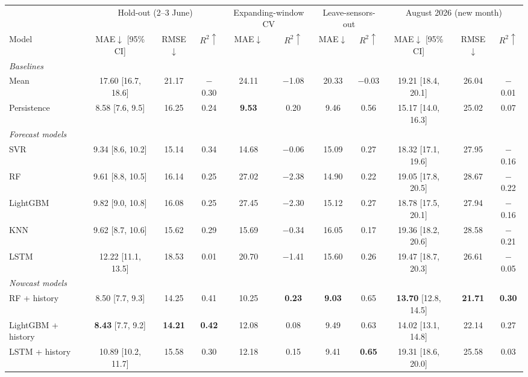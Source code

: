 \begin{tabular}{lcccccccccc}
\toprule
 & \multicolumn{3}{c}{Hold-out (2--3 June)} & \multicolumn{2}{c}{Expanding-window CV} & \multicolumn{2}{c}{Leave-sensors-out} & \multicolumn{3}{c}{August 2026 (new month)} \\
\cmidrule(lr){2-4}\cmidrule(lr){5-6}\cmidrule(lr){7-8}\cmidrule(lr){9-11}
Model & MAE$\downarrow$ [95\% CI] & RMSE$\downarrow$ & $R^2\uparrow$ & MAE$\downarrow$ & $R^2\uparrow$ & MAE$\downarrow$ & $R^2\uparrow$ & MAE$\downarrow$ [95\% CI] & RMSE$\downarrow$ & $R^2\uparrow$ \\
\midrule
\multicolumn{11}{l}{\textit{Baselines}} \\
Mean & 17.60 {\scriptsize[16.7, 18.6]} & 21.17 & $-$0.30 & 24.11 & $-$1.08 & 20.33 & $-$0.03 & 19.21 {\scriptsize[18.4, 20.1]} & 26.04 & $-$0.01 \\
Persistence & 8.58 {\scriptsize[7.6, 9.5]} & 16.25 & 0.24 & \textbf{9.53} & 0.20 & 9.46 & 0.56 & 15.17 {\scriptsize[14.0, 16.3]} & 25.02 & 0.07 \\
\midrule
\multicolumn{11}{l}{\textit{Forecast models}} \\
SVR & 9.34 {\scriptsize[8.6, 10.2]} & 15.14 & 0.34 & 14.68 & $-$0.06 & 15.09 & 0.27 & 18.32 {\scriptsize[17.1, 19.6]} & 27.95 & $-$0.16 \\
RF & 9.61 {\scriptsize[8.8, 10.5]} & 16.14 & 0.25 & 27.02 & $-$2.38 & 14.90 & 0.22 & 19.05 {\scriptsize[17.8, 20.5]} & 28.67 & $-$0.22 \\
LightGBM & 9.82 {\scriptsize[9.0, 10.8]} & 16.08 & 0.25 & 27.45 & $-$2.30 & 15.12 & 0.27 & 18.78 {\scriptsize[17.5, 20.1]} & 27.94 & $-$0.16 \\
KNN & 9.62 {\scriptsize[8.7, 10.6]} & 15.62 & 0.29 & 15.69 & $-$0.34 & 16.05 & 0.17 & 19.36 {\scriptsize[18.2, 20.6]} & 28.58 & $-$0.21 \\
LSTM & 12.22 {\scriptsize[11.1, 13.5]} & 18.53 & 0.01 & 20.70 & $-$1.41 & 15.60 & 0.26 & 19.47 {\scriptsize[18.7, 20.3]} & 26.61 & $-$0.05 \\
\midrule
\multicolumn{11}{l}{\textit{Nowcast models}} \\
RF + history & 8.50 {\scriptsize[7.7, 9.3]} & 14.25 & 0.41 & 10.25 & \textbf{0.23} & \textbf{9.03} & 0.65 & \textbf{13.70} {\scriptsize[12.8, 14.5]} & \textbf{21.71} & \textbf{0.30} \\
LightGBM + history & \textbf{8.43} {\scriptsize[7.7, 9.2]} & \textbf{14.21} & \textbf{0.42} & 12.08 & 0.08 & 9.49 & 0.63 & 14.02 {\scriptsize[13.1, 14.8]} & 22.14 & 0.27 \\
LSTM + history & 10.89 {\scriptsize[10.2, 11.7]} & 15.58 & 0.30 & 12.18 & 0.15 & 9.41 & \textbf{0.65} & 19.31 {\scriptsize[18.6, 20.0]} & 25.58 & 0.03 \\
\bottomrule
\end{tabular}
